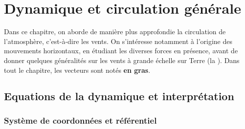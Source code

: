 \chapter{Dynamique et circulation générale}


\bk
Dans ce chapitre, on aborde de manière plus approfondie la circulation de l'atmosphère, c'est-à-dire les vents. On s'intéresse notamment à l'origine des mouvements horizontaux, en étudiant les diverses forces en présence, avant de donner quelques généralités sur les vents à grande échelle sur Terre (la ). Dans tout le chapitre, les vecteurs sont notés \textbf{en gras}.

\mk 
\section{Equations de la dynamique et interprétation}

\sk
\subsection{Système de coordonnées et référentiel}

